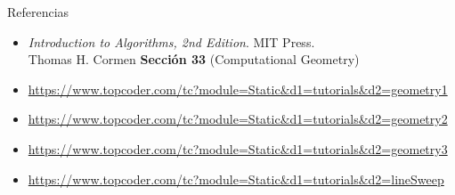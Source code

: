 \documentclass[compress]{beamer}
\begin{document}
\begin{frame}{Referencias}
   \begin{itemize}
   \item \textit{Introduction to Algorithms, 2nd Edition}. MIT Press. \\ Thomas H. Cormen
   \textbf{Sección 33} (Computational Geometry)
   \item \url{https://www.topcoder.com/tc?module=Static&d1=tutorials&d2=geometry1}
   \item \url{https://www.topcoder.com/tc?module=Static&d1=tutorials&d2=geometry2}
   \item \url{https://www.topcoder.com/tc?module=Static&d1=tutorials&d2=geometry3}
   \item \url{https://www.topcoder.com/tc?module=Static&d1=tutorials&d2=lineSweep}
  \end{itemize}
  
\end{frame}
\end{document}
